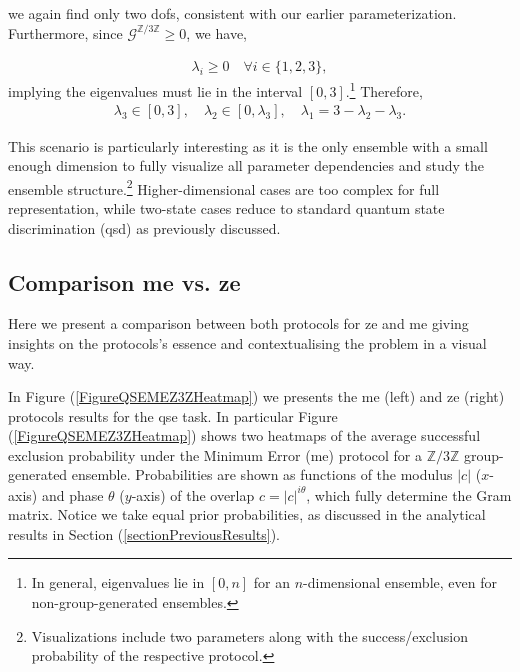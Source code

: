 \documentclass[12pt,letterpaper]{article}
\begin{document}
we again find only two \glspl{dof}, consistent with our earlier parameterization. Furthermore, since $\mathcal{G}^{\mathbb{Z}/3\mathbb{Z}} \geq 0$, we have,

\begin{align*}
	\lambda_i \geq 0 \quad \forall i \in \{1,2,3\},
\end{align*}
implying the eigenvalues must lie in the interval $[0,3]$.\footnote{In general, eigenvalues lie in $[0,n]$ for an $n$-dimensional ensemble, even for non-group-generated ensembles.} Therefore,
\begin{align*}
	\lambda_3 \in [0,3], \quad \lambda_2 \in [0,\lambda_3], \quad \lambda_1 = 3 - \lambda_2 - \lambda_3.
\end{align*}

This scenario is particularly interesting as it is the only ensemble with a small enough dimension to fully visualize all parameter dependencies and study the ensemble structure.\footnote{Visualizations include two parameters along with the success/exclusion probability of the respective protocol.} Higher-dimensional cases are too complex for full representation, while two-state cases reduce to standard quantum state discrimination (\gls{qsd}) as previously discussed.

\subsection{Comparison \gls{me} vs. \gls{ze}}

Here we present a comparison between both protocols for \gls{ze} and \gls{me} giving insights on the protocols's essence and contextualising the problem in a visual way.

In Figure (\ref{FigureQSEMEZ3ZHeatmap})  we presents the \gls{me} (left) and \gls{ze} (right) protocols results for the \gls{qse} task. In particular Figure (\ref{FigureQSEMEZ3ZHeatmap}) shows two heatmaps of the average successful exclusion probability under the Minimum Error (\gls{me}) protocol for a $\mathbb{Z}/3\mathbb{Z}$ group-generated ensemble. Probabilities are shown as functions of the modulus $|c|$ ($x$-axis) and phase $\theta$ ($y$-axis) of the overlap $c=|c|^{i\theta}$, which fully determine the Gram matrix. Notice we take equal prior probabilities, as discussed in the analytical results in Section (\ref{sectionPreviousResults}). 
\end{document}
